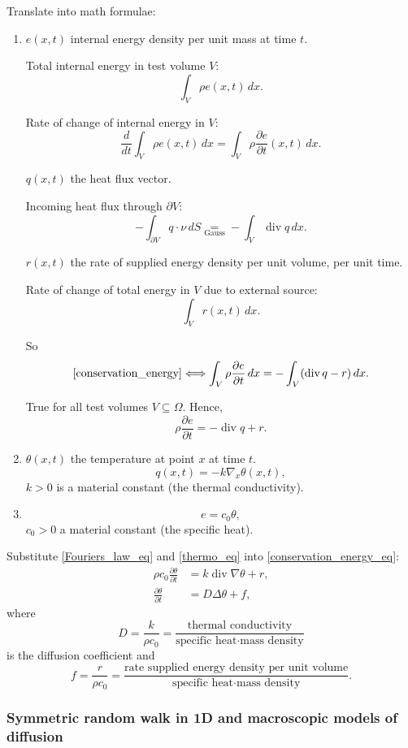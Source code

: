 \documentclass[12pt]{article}
\DeclareMathOperator{\diver}{div}
\theoremstyle{definition}
\begin{document}
Translate into math formulae:
\begin{enumerate}[label=(\arabic*)]
\item\label{conservation_energy_eq} $e(x,t)$ internal energy density per unit mass at time $t$.

Total internal energy in test volume $V$:
\[\int_V\rho e(x,t)\,dx.\]

Rate of change of internal energy in $V$:
\[\frac d{dt}\int_V\rho e(x,t)\,dx=\int_V\rho\frac{\partial e}{\partial t}(x,t)\,dx.\]

$q(x,t)$ the heat flux vector.

Incoming heat flux through $\partial V$:
\[-\int_{\partial V}q\cdot\nu\,dS\underset{\text{Gauss}}=-\int_V\diver q\,dx.\]

$r(x,t)$ the rate of supplied energy density per unit volume, per unit time.

Rate of change of total energy in $V$ due to external source:
\[\int_Vr(x,t)\,dx.\]

So
\[\text{\ref{conservation_energy}}\Longleftrightarrow\int_V\rho\frac{\partial e}{\partial t}\,dx=-\int_V(\diver q-r)\,dx.\]

True for all test volumes $V\subseteq\Omega$. Hence,
\[\rho\frac{\partial e}{\partial t}=-\diver q+r.\]

\item\label{Fouriers_law_eq} $\theta(x,t)$ the temperature at point $x$ at time $t$.
\[q(x,t)=-k\nabla_x\theta(x,t),\]
$k>0$ is a material constant (the thermal conductivity).

\item\label{thermo_eq} \[e=c_0\theta,\]
$c_0>0$ a material constant (the specific heat).
\end{enumerate}

Substitute \ref{Fouriers_law_eq} and \ref{thermo_eq} into \ref{conservation_energy_eq}:
\begin{align*}
\rho c_0\frac{\partial\theta}{\partial t}&=k\diver\nabla\theta+r,\\
\frac{\partial\theta}{\partial t}&=D\Delta\theta+f,
\end{align*}
where
\[D=\frac k{\rho c_0}=\frac{\text{thermal conductivity}}{\text{specific heat}\cdot\text{mass density}}\]
is the diffusion coefficient and
\[f=\frac r{\rho c_0}=\frac{\text{rate supplied energy density per unit volume}}{\text{specific heat}\cdot\text{mass density}}.\]

\subsubsection*{Symmetric random walk in 1D and macroscopic models of diffusion}
\end{document}
